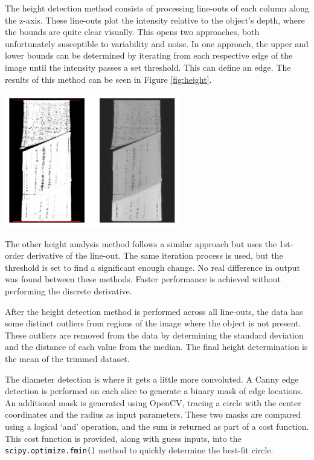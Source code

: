 \documentclass[11pt, letterpaper, notitlepage]{article}
\newenvironment{Figure}
  {\par\medskip\noindent\minipage{\linewidth}}
  {\endminipage\par\medskip}
\begin{document}
\begin{multicols}{2}
The height detection method consists of processing line-outs of each column along the z-axis. These line-outs plot the intensity relative to the object's depth, where the bounds are quite clear visually. This opens two approaches, both unfortunately susceptible to variability and noise. In one approach, the upper and lower bounds can be determined by iterating from each respective edge of the image until the intensity passes a set threshold. This can define an edge. The results of this method can be seen in Figure \ref{fig:height}.

\begin{Figure}
  \centering
  \includegraphics[width=3in]{images/height-fit.png}
  \label{fig:height}
\end{Figure}

The other height analysis method follows a similar approach but uses the 1st-order derivative of the line-out. The same iteration process is used, but the threshold is set to find a significant enough change. No real difference in output was found between these methods. Faster performance is achieved without performing the discrete derivative.

After the height detection method is performed across all line-outs, the data has some distinct outliers from regions of the image where the object is not present. These outliers are removed from the data by determining the standard deviation and the distance of each value from the median. The final height determination is the mean of the trimmed dataset.

The diameter detection is where it gets a little more convoluted. A Canny edge detection is performed on each slice to generate a binary mask of edge locations. An additional mask is generated using OpenCV, tracing a circle with the center coordinates and the radius as input parameters. These two masks are compared using a logical `and' operation, and the sum is returned as part of a cost function. This cost function is provided, along with guess inputs, into the \verb|scipy.optimize.fmin()| method to quickly determine the best-fit circle.


\end{multicols}
\end{document}
